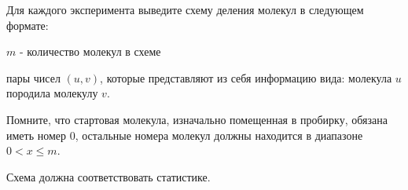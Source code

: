 Для каждого эксперимента выведите схему деления молекул в следующем формате:

$m$ - количество молекул в схеме

пары чисел $(u, v)$, которые представляют из себя информацию вида: молекула $u$ породила молекулу $v$.

Помните, что стартовая молекула, изначально помещенная в пробирку, обязана иметь номер 0, остальные номера молекул должны находится в диапазоне $0 < x \le m$.

Схема должна соответствовать статистике.  